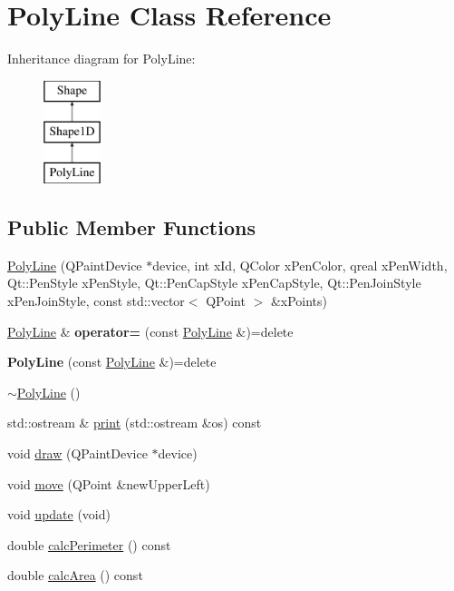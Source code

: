 \hypertarget{classPolyLine}{\section{Poly\-Line Class Reference}
\label{classPolyLine}
}
Inheritance diagram for Poly\-Line\-:\begin{figure}[H]
\begin{center}
\leavevmode
\includegraphics[height=3.000000cm]{classPolyLine}
\end{center}
\end{figure}
\subsection*{Public Member Functions}
\begin{DoxyCompactItemize}
\item 
\hyperlink{classPolyLine_a091b5af5ecbbfa2197a1b4b65274f00c}{Poly\-Line} (Q\-Paint\-Device $\ast$device, int x\-Id, Q\-Color x\-Pen\-Color, qreal x\-Pen\-Width, Qt\-::\-Pen\-Style x\-Pen\-Style, Qt\-::\-Pen\-Cap\-Style x\-Pen\-Cap\-Style, Qt\-::\-Pen\-Join\-Style x\-Pen\-Join\-Style, const std\-::vector$<$ Q\-Point $>$ \&x\-Points)
\item 
\hypertarget{classPolyLine_add038be40a45202389ee90e0d5eeb0fc}{\hyperlink{classPolyLine}{Poly\-Line} \& {\bfseries operator=} (const \hyperlink{classPolyLine}{Poly\-Line} \&)=delete}\label{classPolyLine_add038be40a45202389ee90e0d5eeb0fc}

\item 
\hypertarget{classPolyLine_a57f841f3dc099765f2d25aa07e577534}{{\bfseries Poly\-Line} (const \hyperlink{classPolyLine}{Poly\-Line} \&)=delete}\label{classPolyLine_a57f841f3dc099765f2d25aa07e577534}

\item 
\hyperlink{classPolyLine_ab086c534233b8b8c5eae909eb7a1c2dd}{$\sim$\-Poly\-Line} ()
\item 
std\-::ostream \& \hyperlink{classPolyLine_a716cc39a1e35f7538013760b0828aee6}{print} (std\-::ostream \&os) const 
\item 
void \hyperlink{classPolyLine_a6c4483740c346378276fbd70f007c3f5}{draw} (Q\-Paint\-Device $\ast$device)
\item 
void \hyperlink{classPolyLine_a6f9e35f1f05b2d50c741d09f4f653c4e}{move} (Q\-Point \&new\-Upper\-Left)
\item 
void \hyperlink{classPolyLine_a4d48598e631ad4e94a232e026f458555}{update} (void)
\item 
double \hyperlink{classPolyLine_add3cad6138ab4ccb76330360f208ab80}{calc\-Perimeter} () const 
\item 
double \hyperlink{classPolyLine_abed0b5ce3bab312119d7726c697f2fba}{calc\-Area} () const 
\end{DoxyCompactItemize}
